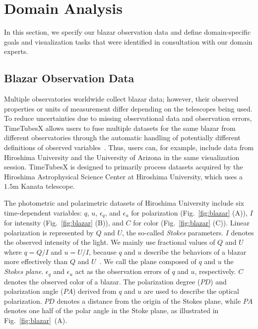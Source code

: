 \section{Domain Analysis}\label{sec:domainAnalysis}
In this section, we specify our blazar observation data and define domain-specific goals and visualization tasks that were identified in consultation with our domain experts. 

\subsection{Blazar Observation Data}\label{sec:BlazarData}
Multiple observatories worldwide collect blazar data; however, their observed properties or units of measurement differ depending on the telescopes being used. 
To reduce uncertainties due to missing observational data and observation errors,
TimeTubesX allows users to fuse multiple datasets for the same blazar from different observatories 
through the automatic handling of potentially different definitions of observed variables~\cite{Fujishiro2018}.
Thus, users can, for example, include data from Hiroshima University and the University of Arizona in the same visualization session. 
TimeTubesX is designed to primarily process datasets acquired by the Hiroshima Astrophysical Science Center at Hiroshima University,
which uses a $1.5\mathrm{m}$ Kanata telescope. 

The photometric and polarimetric datasets of Hiroshima University include six time-dependent variables: $q$, $u$, $\epsilon_q$, and $\epsilon_u$ for polarization (Fig.~\ref{fig:blazar} (A)), $I$ for intensity (Fig.~\ref{fig:blazar} (B)), and $C$ for color (Fig.~\ref{fig:blazar} (C)).
Linear polarization is represented by $Q$ and $U$, the so-called \textit{Stokes} parameters.
$I$ denotes the observed intensity of the light.
We mainly use fractional values of $Q$ and $U$ where $q = Q / I$ and $u = U / I$, 
because $q$ and $u$ describe the behaviors of a blazar more effectively than $Q$ and $U$~\cite{Uemura2016}.
We call the plane composed of $q$ and $u$ the \textit{Stokes plane}.
$\epsilon_q$ and $\epsilon_u$ act as the observation errors of $q$ and $u$, respectively.
$C$ denotes the observed color of a blazar.
The polarization degree ($PD$) and polarization angle ($PA$) derived from $q$ and $u$ are used to describe the optical polarization.
$PD$ denotes a distance from the origin of the Stokes plane, 
while $PA$ denotes one half of the polar angle in the Stoke plane, as illustrated in Fig.~\ref{fig:blazar}~(A).

